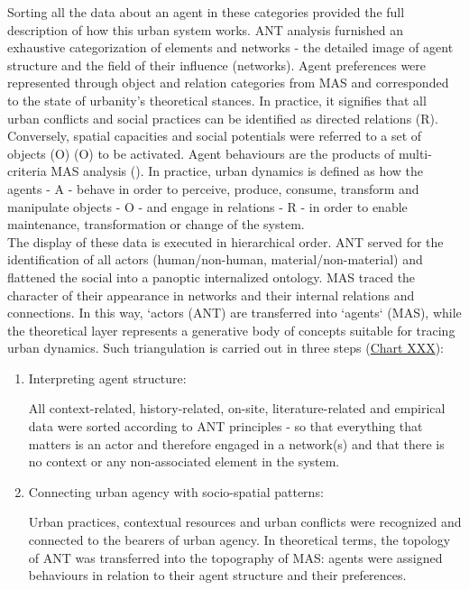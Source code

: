 \documentclass[11pt]{report}
\begin{document}
{{{{Sorting all the data about an agent in these categories provided the full description of how this urban system works. ANT analysis furnished an exhaustive categorization of elements and networks - the detailed image of agent structure and the field of their influence (networks). Agent preferences were represented through object and relation categories from MAS and corresponded to the state of urbanity’s theoretical stances. In practice, it signifies that all urban conflicts and social practices can be identified as directed relations (R). Conversely, spatial capacities and social potentials were referred to a set of objects (O) (O)	to be activated. Agent behaviours are the products of multi-criteria MAS analysis  (\href{Arsanjani}{\citealt{arsanjani_spatiotemporal_2013}}). In practice, urban dynamics is defined as how the agents - A - behave in order to perceive, produce, consume, transform and manipulate objects - O - and engage in relations - R - in order to enable maintenance, transformation or change of the system.
\\

The display of these data is executed in hierarchical order. ANT served for the identification of all actors (human/non-human, material/non-material) and flattened the social into a panoptic internalized ontology. MAS traced the character of their appearance in networks and their internal relations and connections. In this way, ‘actors (ANT) are transferred into ‘agents‘ (MAS), while the theoretical layer represents a generative body of concepts suitable for tracing urban dynamics. Such triangulation is carried out in three steps (\href{Table MAS structural analysos}{Chart XXX}):

\begin{enumerate}
\item Interpreting agent structure:

All context-related, history-related, on-site, literature-related and empirical data were sorted according to ANT principles - so that everything that matters is an actor and therefore engaged in a network(s) and that there is no context or any non-associated element in the system. 

\item Connecting urban agency with socio-spatial patterns:

Urban practices, contextual resources and urban conflicts were recognized and connected to the bearers of urban agency. In theoretical terms, the topology of ANT was transferred into the topography of MAS: agents were assigned behaviours in relation to their agent structure and their preferences.


\end{enumerate}}}}}
\end{document}
